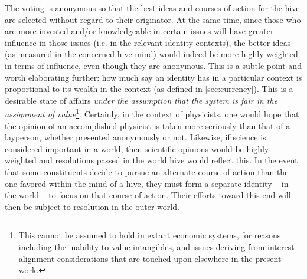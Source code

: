 \documentclass[pra,twocolumn,groupedaddress,10pt]{revtex4}
\theoremstyle{definition}
\begin{document}
The voting is anonymous so that the best ideas and courses of action for the hive are selected without regard to their originator. At the same time, since those who are more invested and/or knowledgeable in certain issues will have greater influence in those issues (i.e. in the relevant identity contexts), the better ideas (as measured in the concerned hive mind) would indeed be more highly weighted in terms of influence, even though they are anonymous. This is a subtle point and worth elaborating further: how much say an identity has in a particular context is proportional to its wealth in the context (as defined in \autoref{sec:currency}). This is a desirable state of affairs \textit{under the assumption that the system is fair in the assignment of value}\footnote{This cannot be assumed to hold in extant economic systems, for reasons including the inability to value intangibles, and issues deriving from interest alignment considerations that are touched upon elsewhere in the present work.}. Certainly, in the context of physicists, one would hope that the opinion of an accomplished physicist is taken more seriously than that of a layperson, whether presented anonymously or not. Likewise, if science is considered important in a world, then scientific opinions would be highly weighted and resolutions passed in the world hive would reflect this. In the event that some constituents decide to pursue an alternate course of action than the one favored within the mind of a hive, they must form a separate identity -- in the world -- to focus on that course of action. Their efforts toward this end will then be subject to resolution in the outer world.
\end{document}
